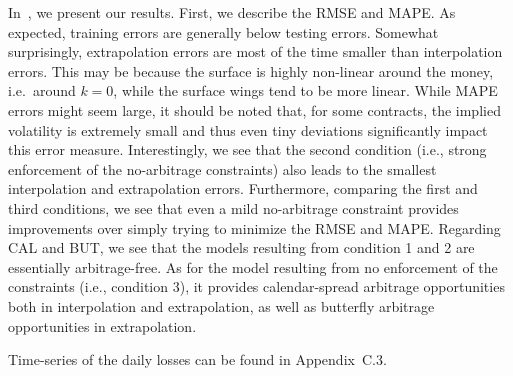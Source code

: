 In~, we present our results.
First, we describe the RMSE and MAPE.
As expected, training errors are generally below testing errors.
Somewhat surprisingly, extrapolation errors are most of the time smaller than interpolation errors.
This may be because the surface is highly non-linear around the money, i.e.\ around $k=0$, while the surface wings tend to be more linear.
While MAPE errors might seem large, it should be noted that, for some contracts, the implied volatility is extremely small and thus even tiny deviations significantly impact this error measure.
Interestingly, we see that the second condition (i.e., strong enforcement of the no-arbitrage constraints) also leads to the smallest interpolation and extrapolation errors.
Furthermore, comparing the first and third conditions, we see that even a mild no-arbitrage constraint provides improvements over simply trying to minimize the RMSE and MAPE.
Regarding CAL and BUT, we see that the models resulting from condition 1 and 2 are essentially arbitrage-free.
As for the model resulting from no enforcement of the constraints (i.e., condition 3), it provides calendar-spread arbitrage opportunities both in interpolation and extrapolation, as well as butterfly arbitrage opportunities in extrapolation.

Time-series of the daily losses can be found in Appendix~C.3.
\vspace{-0.2cm}




